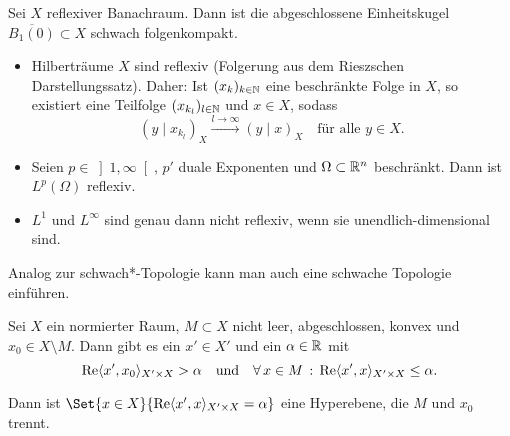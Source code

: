 \documentclass{cheat-sheet}
\newcommand{\scp}[2]{\left( #1 \!\mid\! #2 \right)} %
\renewcommand{\Re}{\operatorname{Re}} %
\newcommand{\convWith}[1]{\xrightarrow{#1 \to \infty}} %
\begin{document}
\begin{satz}
  Sei $X$ reflexiver Banachraum. Dann ist die abgeschlossene Einheitskugel $\overline{B_1(0)} \subset X$ schwach folgenkompakt.
\end{satz}


\begin{bspe}
  \begin{itemize}
    \item Hilberträume $X$ sind reflexiv (Folgerung aus dem Rieszschen Darstellungssatz). Daher: Ist $(x_k)_{k \in \mathbb{N}}$ eine beschränkte Folge in $X$, so existiert eine Teilfolge $(x_{k_l})_{l \in \mathbb{N}}$ und $x \in X$, sodass
    \[
      \scp{y}{x_{k_l}}_X \convWith{l} \scp{y}{x}_X
      \quad \text{für alle $y \in X$.}
    \]
    \item Seien $p \in \left] 1, \infty \right[$, $p'$ duale Exponenten und $\Omega \subset \mathbb{R}^n$ beschränkt. Dann ist $L^p(\Omega)$ reflexiv.
    \item $L^1$ und $L^\infty$ sind genau dann nicht reflexiv, wenn sie unendlich-dimensional sind.
  \end{itemize}
\end{bspe}

\begin{bem}
  Analog zur schwach*-Topologie kann man auch eine schwache Topologie einführen.
\end{bem}



\begin{satz}[Trennungssatz]
  Sei $X$ ein normierter Raum, $M \subset X$ nicht leer, abgeschlossen, konvex und $x_0 \in X \setminus M$. Dann gibt es ein $x' \in X'$ und ein $\alpha \in \mathbb{R}$ mit
  \[
    \Re \langle x', x_0 \rangle_{X' {\times} X} > \alpha
    \quad \text{und} \quad
    \fa{x \in M} \Re \langle x', x \rangle_{X' \times X} \leq \alpha.
  \]
\end{satz}


\begin{bem}
  Dann ist $\Set{ x \in X }{ \Re \langle x', x \rangle_{X' {\times} X} = \alpha }$ eine Hyperebene, die $M$ und $x_0$ trennt.
\end{bem}
\end{document}
